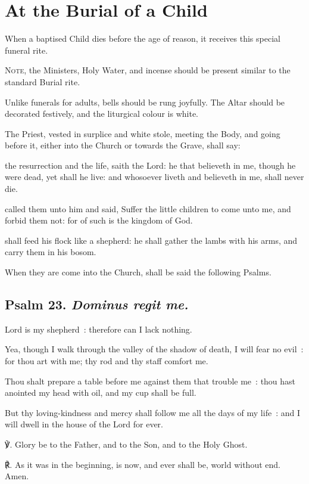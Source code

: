\fancyhead[RE,LO]{\textit{}}
\section{At the Burial of a Child}
\begin{secrubric}
    When a baptised Child dies before the age of reason, it receives this special funeral rite.\par
    \textsc{Note,} the Ministers, Holy Water, and incense should be present similar to the standard Burial rite.
\end{secrubric}
\begin{secrubric}
    Unlike funerals for adults, bells should be rung joyfully. The Altar should be decorated festively, and the liturgical colour is white.
\end{secrubric}
\begin{secrubric}
    The Priest, vested in surplice and white stole, meeting the Body, and going before it, either into the Church or towards the Grave, shall say:
\end{secrubric}
 the resurrection and the life, saith the Lord: he that believeth in me, though he were dead, yet shall he live: and whosoever liveth and believeth in me, shall never die.

 called them unto him and said, Suffer the little children to come unto me, and forbid them not: for of such is the kingdom of God.


 shall feed his flock like a shepherd: he shall gather the lambs with his arms, and carry them in his bosom.


\begin{rubric}
    When they are come into the Church, shall be said the following Psalms.
\end{rubric}

\subsection{Psalm 23. \textit{Dominus regit me.}}
 Lord is my shepherd~: therefore can I lack nothing.\par
{}
Yea, though I walk through the valley of the shadow of death, I will fear no evil~: for thou art with me; thy rod and thy staff comfort me.\par
{}Thou shalt prepare a table before me against them that trouble me~: thou hast anointed my head with oil, and my cup shall be full.\par
{}But thy loving-kindness and mercy shall follow me all the days of my life~: and I will dwell in the house of the Lord for ever.\par
℣. Glory be to the Father, and to the Son, and to the Holy Ghost.\par
℟. As it was in the beginning, is now, and ever shall be, world without end. Amen.

